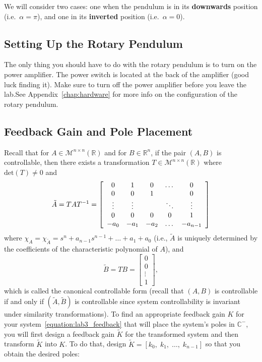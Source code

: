 We will consider two cases: one when the pendulum is in its \textbf{downwards} position (i.e.\ \( \alpha=\pi \)), and one in its \textbf{inverted} position (i.e.\ \( \alpha=0 \)).

\subsection{Setting Up the Rotary Pendulum}
The only thing you should have to do with the rotary pendulum is to turn on the power amplifier. The power switch is located at the back of the amplifier (good luck finding it). Make sure to turn off the power amplifier before you leave the lab.See Appendix~\ref{chap:hardware} for more info on the configuration of the rotary pendulum.

\subsection{Feedback Gain and Pole Placement}\label{subsection:feedback}
Recall that for $A \in \mathcal{M}^{n \times n}(\mathbb{R})$ and for $B \in \mathbb{R}^n$, if the pair $(A,B)$ is controllable, then there exists a transformation $T \in \mathcal{M}^{n \times n}(\mathbb{R})$ where $\text{det}(T) \not = 0$ and
\begin{equation}\label{eq:A_tilde}
    \tilde{A} = TAT^{-1} =
    \left[\begin{array}{c c c c c}
            0      & 1      & 0    & \dots  & 0        \\
            0      & 0      & 1    &        & 0        \\
            \vdots & \vdots &      & \ddots & \vdots   \\
            0      & 0      & 0    & 0      & 1        \\
            -a_0   & -a_1   & -a_2 & \dots  & -a_{n-1}
        \end{array}\right]
\end{equation}
where $\chi_{A} = \chi_{\tilde{A}} = s^n + a_{n-1} s^{n-1} + \dots + a_1 + a_0$ (i.e., $\tilde{A}$ is uniquely determined by the coefficients of the characteristic polynomial of $A$), and
\[
    \tilde{B} = TB =
    \left[\begin{array}{c}
            0      \\
            0      \\
            \vdots \\
            1
        \end{array}\right],
\]
which is called the canonical controllable form (recall that $(A,B)$ is controllable if and only if $(\tilde{A},\tilde{B})$ is controllable since system controllability is invariant under similarity transformations). To find an appropriate feedback gain $K$ for your system~\eqref{equation:lab3_feedback} that will place the system's poles in $\mathbb{C}^-$, you will first design a feedback gain $\tilde{K}$ for the transformed system and then transform $\tilde{K}$ into $K$. To do that, design $\tilde{K} = [k_0, \; k_1, \; \dots, \; k_{n-1}]$ so that you obtain the desired poles:
